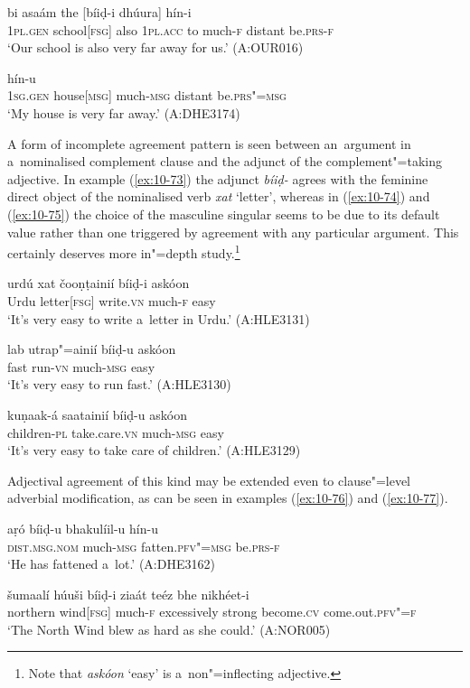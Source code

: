 \begin{exe}
\ex
\label{ex:10-71}
 bi asaám the [bíiḍ-i dhúura] hín-i \\
\textsc{1pl.gen} school[\textsc{fsg}] also \textsc{1pl.acc} to much-\textsc{f} distant be.\textsc{prs-f}  \\
\glt `Our school is also very far away for us.' (A:OUR016)

\ex
\label{ex:10-72}
 hín-u \\
\textsc{1sg.gen} house[\textsc{msg}] much-\textsc{msg} distant be.\textsc{prs"=msg}  \\
\glt `My house is very far away.' (A:DHE3174)
\end{exe}

A form of incomplete agreement pattern is seen between an~argument in a~nominalised complement clause and the adjunct of the complement"=taking adjective. In example (\ref{ex:10-73}) the adjunct \textit{bíiḍ-} agrees with the feminine direct object of the nominalised verb \textit{xat} `letter', whereas in (\ref{ex:10-74}) and (\ref{ex:10-75}) the choice of the masculine singular seems to be due to its default value rather than one triggered by agreement with any particular argument. This certainly deserves more in"=depth study.\footnote{Note that \textit{askóon} `easy' is a~non"=inflecting adjective.}

\begin{exe}
\ex
\label{ex:10-73}
\gll urdú xat čooṇṭainií bíiḍ-i askóon \\
Urdu letter[\textsc{fsg}] write.\textsc{vn} much-\textsc{f} easy  \\
\glt `It's very easy to write a~letter in Urdu.' (A:HLE3131)

\ex
\label{ex:10-74}
\gll lab utrap"=ainií bíiḍ-u askóon \\
fast run-\textsc{vn} much-\textsc{msg} easy \\
\glt `It's very easy to run fast.' (A:HLE3130)

\ex
\label{ex:10-75}
\gll kuṇaak-á saatainií bíiḍ-u askóon \\
children-\textsc{pl} take.care.\textsc{vn} much-\textsc{msg} easy \\
\glt `It's very easy to take care of children.' (A:HLE3129)
\end{exe}

Adjectival agreement of this kind may be extended even to clause"=level adverbial modification, as can be seen in examples (\ref{ex:10-76}) and (\ref{ex:10-77}).

\begin{exe}
\ex
\label{ex:10-76}
\gll aṛó bíiḍ-u bhakulíil-u hín-u \\
 \textsc{dist.msg.nom} much-\textsc{msg} fatten.\textsc{pfv"=msg} be.\textsc{prs-f} \\
\glt `He has fattened a~lot.' (A:DHE3162)

\ex
\label{ex:10-77}
\gll šumaalí húuši bíiḍ-i ziaát teéz bhe nikhéet-i\\
northern wind[\textsc{fsg}] much-\textsc{f} excessively strong become.\textsc{cv} come.out.\textsc{pfv"=f}\\
\glt `The North Wind blew as hard as she could.' (A:NOR005)
\end{exe}